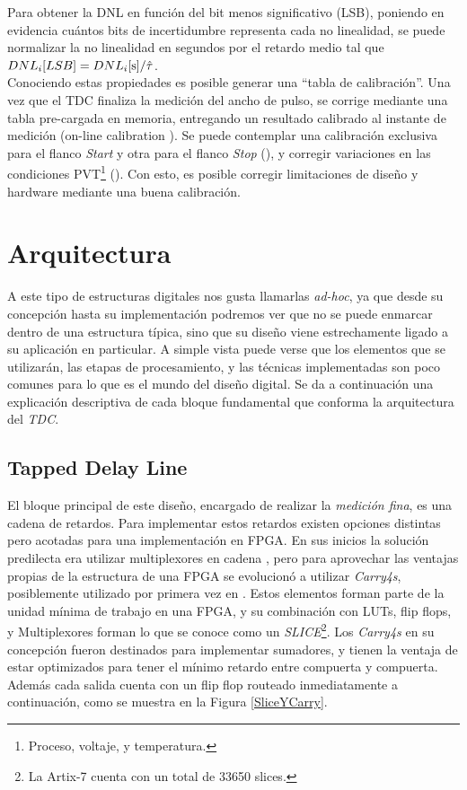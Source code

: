 Para obtener la DNL en función del bit menos significativo (LSB), poniendo 
en evidencia cuántos bits de incertidumbre representa cada no linealidad, 
se puede normalizar la no linealidad en segundos por el retardo medio tal que $DNL_i[LSB] = DNL_i[\rm{s}] / \hat{\tau}$.\\
Conociendo estas propiedades es posible generar una ``tabla de calibración''. Una vez que el TDC
finaliza la medición del ancho de pulso, se corrige mediante una tabla pre-cargada en memoria, entregando un resultado
calibrado al instante de medición (on-line calibration \cite{Liu2015}). Se puede contemplar
una calibración exclusiva para el flanco \textit{Start} y otra para el flanco \textit{Stop} (\cite{Khaddour2023}), y 
corregir variaciones en las condiciones PVT\footnote{Proceso, voltaje, y temperatura.} (\cite{Qin2017}).
Con esto, es posible corregir limitaciones de diseño y hardware mediante una buena calibración.\\

\section{Arquitectura}

A este tipo de estructuras digitales nos gusta llamarlas \textit{ad-hoc}, ya que desde su concepción hasta su
implementación podremos ver que no se puede enmarcar dentro de una estructura típica, sino que su diseño viene estrechamente ligado
a su aplicación en particular. A simple vista puede verse que los elementos que se utilizarán, las etapas de procesamiento,
y las técnicas implementadas son poco comunes para lo que es el mundo del diseño digital. Se da a continuación 
una explicación descriptiva de cada bloque fundamental que conforma la arquitectura del \textit{TDC}.

\subsection{Tapped Delay Line}
El bloque principal de este diseño, encargado de realizar la \textit{medición fina}, es una cadena de retardos.
Para implementar estos retardos existen opciones distintas pero acotadas para una implementación en FPGA. En sus
inicios la solución predilecta era utilizar multiplexores en cadena \cite{kalisz_field-programmable-gate-array-based_1997},
pero para aprovechar las ventajas propias de la estructura de una FPGA se evolucionó a utilizar
\textit{Carry4s}, posiblemente utilizado por primera vez en \cite{favi_17ps_2009}. Estos elementos
forman parte de la unidad mínima de trabajo en una FPGA, y su combinación con LUTs, flip flops, y Multiplexores forman lo que 
se conoce como un \textit{SLICE}\footnote[1]{La Artix-7 cuenta con un total de 33650 slices.}. 
Los \textit{Carry4s} en su concepción fueron destinados para implementar sumadores, y tienen la ventaja de estar optimizados
para tener el mínimo retardo entre compuerta y compuerta. Además cada salida cuenta con un flip flop routeado inmediatamente
a continuación, como se muestra en la Figura \ref{SliceYCarry}.


